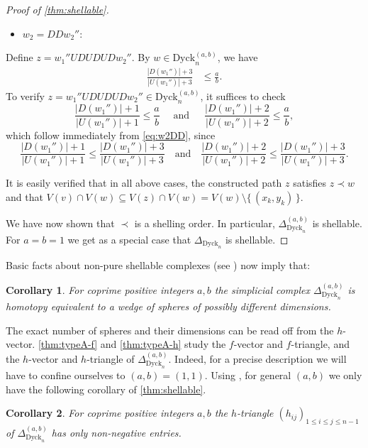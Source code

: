 \documentclass[11pt]{amsart}
\def\Dyck{\mathrm{Dyck}}
\theoremstyle{plain}
\numberwithin{lemma}{\DefaultNumberTheoremWithin}
\numberwithin{theorem}{\DefaultNumberTheoremWithin}
\newtheorem{corollary}{Corollary}
\numberwithin{corollary}{\DefaultNumberTheoremWithin}
\numberwithin{proposition}{\DefaultNumberTheoremWithin}
\numberwithin{conjecture}{\DefaultNumberTheoremWithin}
\theoremstyle{definition}
\numberwithin{definition}{\DefaultNumberTheoremWithin}
\numberwithin{question}{\DefaultNumberTheoremWithin}
\numberwithin{problem}{\DefaultNumberTheoremWithin}
\theoremstyle{remark}
\numberwithin{remark}{\DefaultNumberTheoremWithin}
\numberwithin{example}{\DefaultNumberTheoremWithin}
\numberwithin{claim}{\DefaultNumberTheoremWithin}
\begin{document}
\begin{proof}[Proof of \ref{thm:shellable}]
  
  \medskip
  
  \begin{itemize}
      \item[$\longrightarrow$]
    $w_2 = D D w_2''$:
    \end{itemize}
    Define $z = w_1'' U D U D U Dw_2''$.
   By $w\in \Dyck^{(a,b)}_n$, we have
\begin{align} \label{eq:w2DD}
\frac{|D(w_1'')| + 3}{|U(w_1'')| + 3} & \le \frac{a}{b}.
\end{align}
To verify $z = w_1'' U D U D U D w_2'' \in \Dyck^{(a,b)}_n$, it suffices to check
\[
\frac{|D(w_1'')| + 1}{|U(w_1'')| + 1} \le \frac{a}{b} \quad\text{ and }\,\quad 
\frac{|D(w_1'')| + 2}{|U(w_1'')| + 2} \le \frac{a}{b},
\]
which follow immediately from \eqref{eq:w2DD}, since
\[
\frac{|D(w_1'')| + 1}{|U(w_1'')| + 1} \le \frac{|D(w_1'')| + 3}{|U(w_1'')| + 3}
\quad\text{and}\quad
\frac{|D(w_1'')| + 2}{|U(w_1'')| + 2} \le \frac{|D(w_1'')| + 3}{|U(w_1'')| + 3}.
\]

It is easily verified that in all above cases, the constructed path $z$ satisfies
$z \prec w$ and that
$
V(v) \cap V(w) \subseteq V(z) \cap V(w) = V(w) \setminus \{\,(x_k,y_k)\,\}.
$

We have now shown that $\prec$ is a shelling order.
In particular, $\Delta_{\Dyck_n}^{(a,b)}$ is shellable.
    For $a=b= 1$ we get as a special case that $\Delta_{\Dyck_n}$ is shellable.
\end{proof}


Basic facts about non-pure shellable complexes (see \cite[Theorem 4.1]{BjoWac96}) now imply that:

\begin{corollary}\label{cor:wedge1}
    For coprime positive integers $a,b$ the simplicial complex $\Delta_{\Dyck_n}^{(a,b)}$ is homotopy equivalent to a wedge of spheres of 
    possibly different dimensions. 
\end{corollary}

 
The exact number of spheres and their dimensions can be read off from the $h$-vector. \ref{thm:typeA-f} and \ref{thm:typeA-h} study the $f$-vector and $f$-triangle, and
the $h$-vector and $h$-triangle 
of $\Delta_{\Dyck_n}^{(a,b)}$. Indeed, for a precise
description we will have to confine ourselves to $(a,b) = (1,1)$. 
Using \cite[Theorem 3.4]{BjoWac96}, for general $(a,b)$ we only have the following corollary of \ref{thm:shellable}.

\begin{corollary}\label{cor:wedge2}
    For coprime positive integers $a,b$ the 
    $h$-triangle $(h_{ij})_{1 \leq i\leq j \leq n-1}$ of
    $\Delta_{\Dyck_n}^{(a,b)}$ has only non-negative entries.
 \end{corollary}
 
\end{document}
